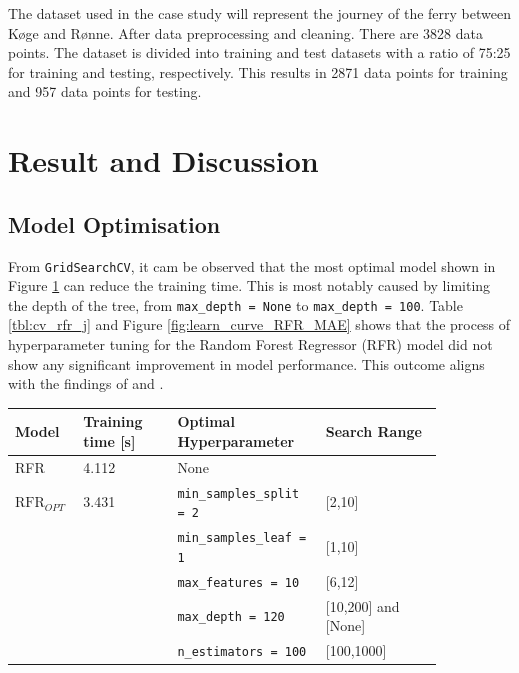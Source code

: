 \documentclass[]{interact}
\theoremstyle{plain}%
\theoremstyle{definition}
\theoremstyle{remark}
\begin{document}
The dataset used in the case study will represent the journey of the ferry between K{\o}ge and R{\o}nne. After data preprocessing and cleaning. There are 3828 data points. The dataset is divided into training and test datasets with a ratio of 75:25 for training and testing, respectively. This results in 2871 data points for training and 957 data points for testing.

\section{Result and Discussion}\label{sec:research_discussion_j}

\subsection{Model Optimisation}\label{sec:hpo_journal}

From \texttt{GridSearchCV}, it cam be observed that the most optimal model shown in Figure \ref{tbl:hpo_optimal} can reduce the training time. This is most notably caused by limiting the depth of the tree, from \texttt{max\_depth = None} to \texttt{max\_depth = 100}. Table \ref{tbl:cv_rfr_j} and Figure \ref{fig:learn_curve_RFR_MAE} shows that the process of hyperparameter tuning for the Random Forest Regressor (RFR) model did not show any significant improvement in model performance. This outcome aligns with the findings of \citet{Kuhn.2013} and \citet{Hastie.2009}.

\begin{table}
    {\begin{tabular}{ p{0.1\linewidth} p{0.2\linewidth}  p{0.3\linewidth} p{0.25\linewidth}}
    \hline
    Model & Training time [s] &  Optimal Hyperparameter & Search Range \\
    \hline
    RFR & 4.112 & None \\
    $\text{RFR}_{OPT}$ & 3.431  & {\tt min\_samples\_split = 2} & [2,10]\\
    &&{\tt min\_samples\_leaf = 1} & [1,10]\\
    &&{\tt max\_features = 10} & [6,12]\\
    &&{\tt max\_depth = 120} & [10,200] and [None]\\
    &&{\tt n\_estimators = 100} & [100,1000]\\
    \hline
    \end{tabular}}
  \label{tbl:hpo_optimal}
\end{table}
\end{document}
